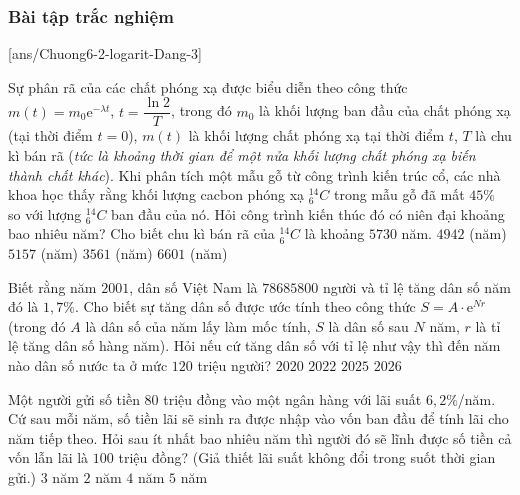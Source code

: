 \subsubsection{Bài tập trắc nghiệm}
[ans/Chuong6-2-logarit-Dang-3]
\begin{ex}
	Sự phân rã của các chất phóng xạ được biểu diễn theo công thức $m(t)=m_0\mathrm{e}^{-\lambda t}$, $t=\dfrac{\ln 2}{T}$, trong đó $m_0$ là khối lượng ban đầu của chất phóng xạ (tại thời điểm $t=0$), $m(t)$ là khối lượng chất phóng xạ tại thời điểm $t$, $T$ là chu kì bán rã ({\it tức là khoảng thời gian để một nửa khối lượng chất phóng xạ biến thành chất khác}). Khi phân tích một mẫu gỗ từ công trình kiến trúc cổ, các nhà khoa học thấy rằng khối lượng cacbon phóng xạ $^ { 14 }_6 C$ trong mẫu gỗ đã mất $45\%$ so với lượng $^ { 14 }_6 C$ ban đầu của nó. Hỏi công trình kiến thúc đó có niên đại khoảng bao nhiêu năm? Cho biết chu kì bán rã của $^ { 14 }_6 C$ là khoảng $5730$ năm.
	\choice
	{\True $4942$ (năm)}
	{$5157$ (năm)}
	{$3561$ (năm)}
	{$6601$ (năm)}
\end{ex}

\begin{ex}
	Biết rằng năm $2001$, dân số Việt Nam là $78685800$ người và tỉ lệ tăng dân số năm đó là $1{,}7\%$. Cho biết sự tăng dân số được ước tính theo công thức $S= A\cdot \mathrm{e}^{Nr}$ (trong đó $A$ là dân số của năm lấy làm mốc tính, $S$ là dân số sau $N$ năm, $r$ là tỉ lệ tăng dân số hàng năm). Hỏi nếu cứ tăng dân số với tỉ lệ như vậy thì đến năm nào dân số nước ta ở mức $120$ triệu người?
	\choice
	{$2020$}
	{$2022$}
	{$2025$}
	{\True $2026$}
\end{ex}

\begin{ex}
	Một người gửi số tiền $80$ triệu đồng vào một ngân hàng với lãi suất $6{,}2\%$/năm. Cứ sau mỗi năm, số tiền lãi sẽ sinh ra được nhập vào vốn ban đầu để tính lãi cho năm tiếp theo. Hỏi sau ít nhất bao nhiêu năm thì người đó sẽ lĩnh được số tiền cả vốn lẫn lãi là $100$ triệu đồng? (Giả thiết lãi suất không đổi trong suốt thời gian gửi.)
	\choice
	{$3$ năm}
	{$2$ năm}
	{\True $4$ năm}
	{$5$ năm}
\end{ex}

